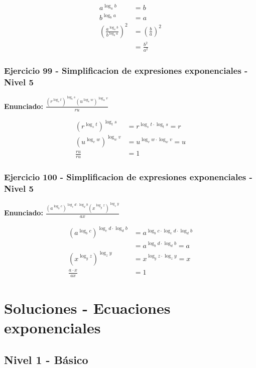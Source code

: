 \documentclass[12pt,a4paper]{article}
\begin{document}
\[
\begin{aligned}
a^{\log_a b}&=b\\
b^{\log_b a}&=a\\
\left(\frac{a^{\log_a b}}{b^{\log_b a}}\right)^2&=\left(\frac ba\right)^2\\
&=\boxed{\frac{b^2}{a^2}}
\end{aligned}
\]


\subsubsection*{Ejercicio 99 - Simplificacion de expresiones exponenciales - Nivel 5}
\textbf{Enunciado:} \(\frac{(r^{\log_s t})^{\log_t s}(u^{\log_v w})^{\log_w v}}{ru}\)

\[
\begin{aligned}
(r^{\log_s t})^{\log_t s}&=r^{\log_s t\cdot\log_t s}=r\\
(u^{\log_v w})^{\log_w v}&=u^{\log_v w\cdot\log_w v}=u\\
\frac{ru}{ru}&=\boxed{1}
\end{aligned}
\]


\subsubsection*{Ejercicio 100 - Simplificacion de expresiones exponenciales - Nivel 5}
\textbf{Enunciado:} \(\frac{(a^{\log_b c})^{\log_c d\cdot\log_d b}(x^{\log_y z})^{\log_z y}}{ax}\)

\[
\begin{aligned}
(a^{\log_b c})^{\log_c d\cdot\log_d b}&=a^{\log_b c\cdot\log_c d\cdot\log_d b}\\
&=a^{\log_b d\cdot\log_d b}=a\\
(x^{\log_y z})^{\log_z y}&=x^{\log_y z\cdot\log_z y}=x\\
\frac{a\cdot x}{ax}&=\boxed{1}
\end{aligned}
\]


\newpage
\section*{Soluciones - Ecuaciones exponenciales}

\subsection*{Nivel 1 - Básico}
\end{document}
